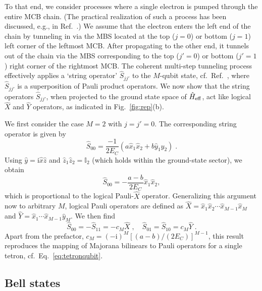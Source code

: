 \documentclass[twocolumn,floats,prx,showpacs]{revtex4-1}
\newcommand{\id}{\mathbb{I}}
\def\id{\mathbb{I}}
\begin{document}
To that end, we consider processes where a single electron is pumped through the entire MCB chain. (The practical realization of such a process has been discussed, e.g., in Ref.~\cite{PhysRevB.94.174514}.)  
We assume that the electron enters the left end of the chain by tunneling in 
via the MBS located at the top ($j=0$) or bottom ($j=1$) left corner of the leftmost MCB.
After propagating to the other end, it tunnels out of the chain via 
the MBS corresponding to the top ($j'=0$) or bottom ($j'=1$) right corner 
of the rightmost MCB.  The coherent multi-step tunneling process effectively
applies a `string operator' $\hat S_{jj'}$ to the $M$-qubit state, cf.~Ref.~\cite{PhysRevB.94.174514}, where $\hat S_{jj'}$
is a superposition of Pauli product operators. 
We now show that the string operators $\hat S_{jj'}$, when projected to 
the ground state space of $\hat H_{\rm eff}$, act like 
logical $\hat X$ and $\hat Y$ operators, 
as indicated in Fig.~\ref{fig:rep}(b).

We first consider the case $M=2$ with $j=j'=0$. 
The corresponding string operator is given by
\begin{equation}
\hat S_{00}= \frac{-1}{2E_C} \left( a \hat x_1 \hat x_2 + b \hat y_1 \hat y_2\right)\;.
\end{equation}
Using $\hat y= \mathrm i \hat x \hat z$ and $\hat z_1 
\hat z_2=\id_2$ (which holds within the ground-state sector), we obtain 
\begin{equation}
\hat S_{00}= -\frac{a-b}{2E_C} \hat x_1 \hat x_2,
\end{equation} 
which is proportional to the logical Pauli-$\hat X$ operator. 
Generalizing this argument now to arbitrary $M$, 
logical Pauli operators are defined as
$\hat X = \hat x_1 \hat x_2 \cdots \hat x_{M-1}\hat x_M$ and
$\hat Y = \hat x_1 \cdots \hat x_{M-1} \hat y_M$.
We then find   
\begin{equation}\label{eq:repoperators}
\hat S_{00}=- \hat S_{11} = -c_M \hat X \;, \quad
\hat S_{01}= \hat S_{10}=c_M \hat Y \;.
\end{equation}
Apart from the prefactor, $c_M=(-\mathrm i)^M [(a-b)/(2E_C)]^{M-1}$, this result reproduces the mapping of Majorana bilinears to Pauli operators for a single tetron, cf.~Eq.~\eqref{eq:tetronqubit}. 

\subsection{Bell states}\label{sec3d}
\end{document}
